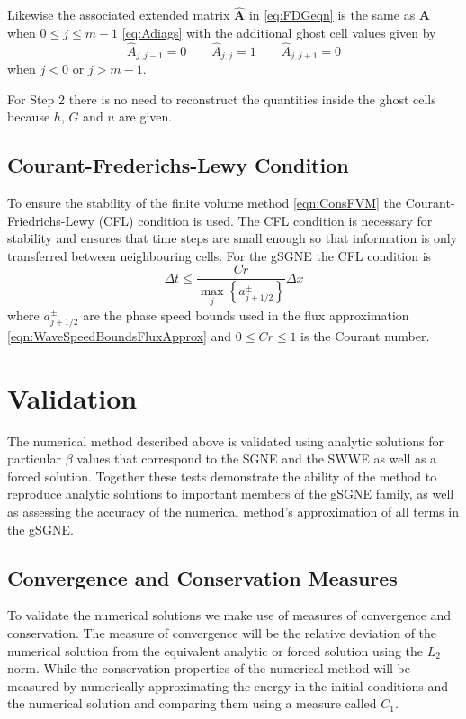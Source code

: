 \documentclass[10pt]{elsarticle}
\newcommand{\vecn}[1]{\boldsymbol{#1}}
\begin{document}
Likewise the associated extended matrix $\vecn{\hat{A}}$ in \eqref{eq:FDGeqn} is the same as $\vecn{A}$ when $0 \le j \le m -1$  \eqref{eq:Adiags} with the additional ghost cell values given by
\begin{equation*}
\hat{A}_{j,j-1} =  0  \quad \quad
\hat{A}_{j,j} = 1 \quad \quad
\hat{A}_{j,j+1} = 0
\end{equation*}
when $j < 0$ or $j > m -1$. 

For Step 2 there is no need to reconstruct the quantities inside the ghost cells because $h$, $G$ and $u$ are given. 


\subsection{Courant-Frederichs-Lewy Condition}
To ensure the stability of the finite volume method \eqref{eqn:ConsFVM} the Courant-Friedrichs-Lewy (CFL) condition \cite{Courant-etal-1967-215} is used. The CFL condition is necessary for stability and ensures that time steps are small enough so that information is only transferred between neighbouring cells. For the gSGNE the CFL condition is 
\begin{equation}
\Delta t \le \frac{Cr }{\max_{j} \left\lbrace a^\pm_{j+1/2} \right\rbrace} \Delta x
\label{eqn:CFLcond}
\end{equation}
where $a^\pm_{j+1/2} $ are the phase speed bounds used in the flux approximation \eqref{eqn:WaveSpeedBoundsFluxApprox} and $0\le Cr \le 1$ is the Courant number.

\section{Validation}
The numerical method described above is validated using analytic solutions for particular $\beta$ values that correspond to the SGNE and the SWWE as well as a forced solution. Together these tests demonstrate the ability of the method to reproduce analytic solutions to important members of the gSGNE family, as well as assessing the accuracy of the numerical method's approximation of all terms in the gSGNE.

\subsection{Convergence and Conservation Measures}
To validate the numerical solutions we make use of measures of convergence and conservation. The measure of convergence will be the relative deviation of the numerical solution from the equivalent analytic or forced solution using the $L_2$ norm. While the conservation properties of the numerical method will be measured by numerically approximating the energy in the initial conditions and the numerical solution and comparing them using a measure called $C_1$.
\end{document}
